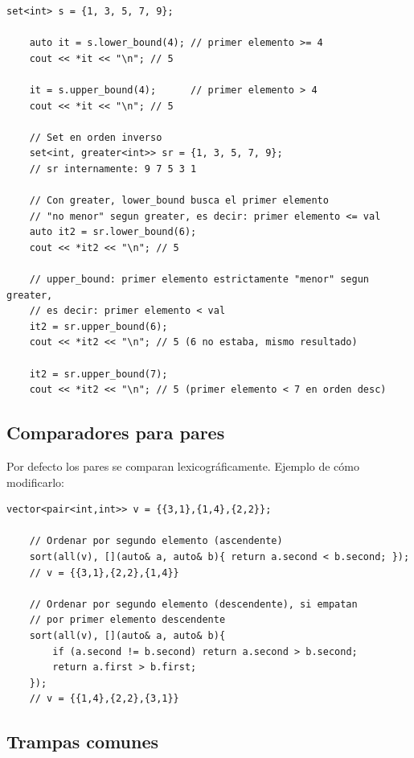 \begin{lstlisting}[style=cppstyle, caption={lower\_bound en set normal y set invertido}]
    set<int> s = {1, 3, 5, 7, 9};

    auto it = s.lower_bound(4); // primer elemento >= 4
    cout << *it << "\n"; // 5

    it = s.upper_bound(4);      // primer elemento > 4
    cout << *it << "\n"; // 5

    // Set en orden inverso
    set<int, greater<int>> sr = {1, 3, 5, 7, 9};
    // sr internamente: 9 7 5 3 1

    // Con greater, lower_bound busca el primer elemento
    // "no menor" segun greater, es decir: primer elemento <= val
    auto it2 = sr.lower_bound(6);
    cout << *it2 << "\n"; // 5

    // upper_bound: primer elemento estrictamente "menor" segun greater,
    // es decir: primer elemento < val
    it2 = sr.upper_bound(6);
    cout << *it2 << "\n"; // 5 (6 no estaba, mismo resultado)

    it2 = sr.upper_bound(7);
    cout << *it2 << "\n"; // 5 (primer elemento < 7 en orden desc)
\end{lstlisting}

\subsection{Comparadores para pares}

Por defecto los pares se comparan lexicográficamente. Ejemplo de cómo modificarlo:

\begin{lstlisting}[style=cppstyle, caption={Ordenar pares por segundo elemento}]
    vector<pair<int,int>> v = {{3,1},{1,4},{2,2}};

    // Ordenar por segundo elemento (ascendente)
    sort(all(v), [](auto& a, auto& b){ return a.second < b.second; });
    // v = {{3,1},{2,2},{1,4}}

    // Ordenar por segundo elemento (descendente), si empatan
    // por primer elemento descendente
    sort(all(v), [](auto& a, auto& b){
        if (a.second != b.second) return a.second > b.second;
        return a.first > b.first;
    });
    // v = {{1,4},{2,2},{3,1}}
\end{lstlisting}

\subsection{Trampas comunes}

